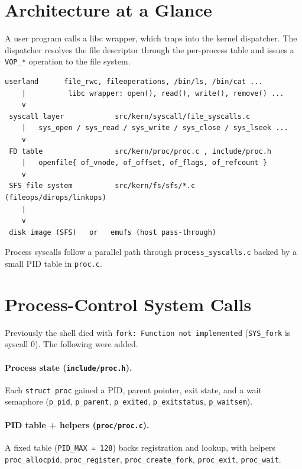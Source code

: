 \documentclass[11pt,a4paper]{article}
\begin{document}
\section{Architecture at a Glance}
A user program calls a libc wrapper, which traps into the kernel dispatcher.
The dispatcher resolves the file descriptor through the per-process table and
issues a \texttt{VOP\_*} operation to the file system.

\begin{lstlisting}[caption={End-to-end path of a file operation.}]
 userland      file_rwc, fileoperations, /bin/ls, /bin/cat ...
    |          libc wrapper: open(), read(), write(), remove() ...
    v
 syscall layer            src/kern/syscall/file_syscalls.c
    |   sys_open / sys_read / sys_write / sys_close / sys_lseek ...
    v
 FD table                 src/kern/proc/proc.c , include/proc.h
    |   openfile{ of_vnode, of_offset, of_flags, of_refcount }
    v
 SFS file system          src/kern/fs/sfs/*.c   (fileops/dirops/linkops)
    |
    v
 disk image (SFS)   or   emufs (host pass-through)
\end{lstlisting}

Process syscalls follow a parallel path through \texttt{process\_syscalls.c}
backed by a small PID table in \texttt{proc.c}.

\FloatBarrier
\section{Process-Control System Calls}
Previously the shell died with \texttt{fork: Function not implemented}
(\texttt{SYS\_fork} is syscall 0). The following were added.

\paragraph{Process state (\texttt{include/proc.h}).}
Each \texttt{struct proc} gained a PID, parent pointer, exit state, and a wait
semaphore (\texttt{p\_pid}, \texttt{p\_parent}, \texttt{p\_exited},
\texttt{p\_exitstatus}, \texttt{p\_waitsem}).

\paragraph{PID table + helpers (\texttt{proc/proc.c}).}
A fixed table (\texttt{PID\_MAX = 128}) backs registration and lookup, with
helpers \texttt{proc\_allocpid}, \texttt{proc\_register},
\texttt{proc\_create\_fork}, \texttt{proc\_exit}, \texttt{proc\_wait}.
\end{document}
